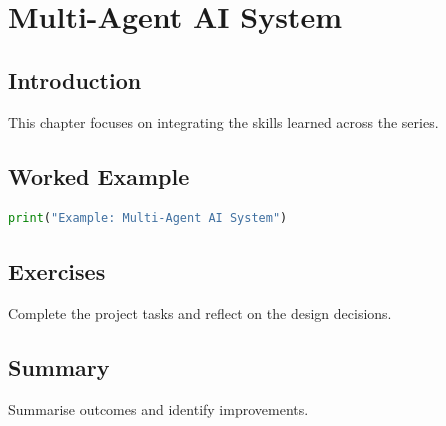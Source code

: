 \chapter{Multi-Agent AI System}
\label{chap:vol11-3}
\section{Introduction}
This chapter focuses on integrating the skills learned across the series.
\section{Worked Example}
\begin{lstlisting}[language=Python]
print("Example: Multi-Agent AI System")
\end{lstlisting}
\section{Exercises}
\begin{exercise}
Complete the project tasks and reflect on the design decisions.
\end{exercise}
\section{Summary}
Summarise outcomes and identify improvements.
